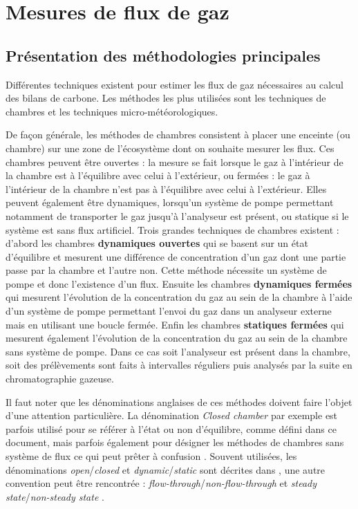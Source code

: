 \section{Mesures de flux de gaz}
\label{sec:clsd_chbr_method}

\subsection{Présentation des méthodologies principales}

Différentes techniques existent pour estimer les flux de gaz nécessaires au calcul des bilans de carbone.
Les méthodes les plus utilisées sont les techniques de chambres et les techniques micro-météorologiques.

De façon générale, les méthodes de chambres consistent à placer une enceinte (ou chambre) sur une zone de l'écosystème dont on souhaite mesurer les flux.
Ces chambres peuvent être ouvertes : la mesure se fait lorsque le gaz à l'intérieur de la chambre est à l'équilibre avec celui à l'extérieur, ou fermées : le gaz à l'intérieur de la chambre n'est pas à l'équilibre avec celui à l'extérieur.
Elles peuvent également être dynamiques, lorsqu'un système de pompe permettant notamment de transporter le gaz jusqu'à l'analyseur est présent, ou statique si le système est sans flux artificiel.
Trois grandes techniques de chambres existent : d'abord les chambres \textbf{dynamiques ouvertes} qui se basent sur un état d'équilibre et mesurent une différence de concentration d'un gaz dont une partie passe par la chambre et l'autre non. 
Cette méthode nécessite un système de pompe et donc l'existence d'un flux.
Ensuite les chambres \textbf{dynamiques fermées} qui mesurent l'évolution de la concentration du gaz au sein de la chambre à l'aide d'un système de pompe permettant l'envoi du gaz dans un analyseur externe mais en utilisant une boucle fermée.
Enfin les chambres \textbf{statiques fermées} qui mesurent également l'évolution de la concentration du gaz au sein de la chambre sans système de pompe.
Dans ce cas soit l'analyseur est présent dans la chambre, soit des prélèvements sont faits à intervalles réguliers puis analysés par la suite en chromatographie gazeuse.

Il faut noter que les dénominations anglaises de ces méthodes doivent faire l'objet d'une attention particulière.
La dénomination \textit{Closed chamber} par exemple est parfois utilisé pour se référer à l'état ou non d'équilibre, comme défini dans ce document, mais parfois également pour désigner les méthodes de chambres sans système de flux ce qui peut prêter à confusion \citep{pumpanen2004}.
Souvent utilisées, les dénominations \textit{open}/\textit{closed} et \textit{dynamic}/\textit{static} sont décrites dans \citet{luo2006161}, une autre convention peut être rencontrée : \textit{flow-through}/\textit{non-flow-through} et \textit{steady state}/\textit{non-steady state} \citep{livingston1995}.

